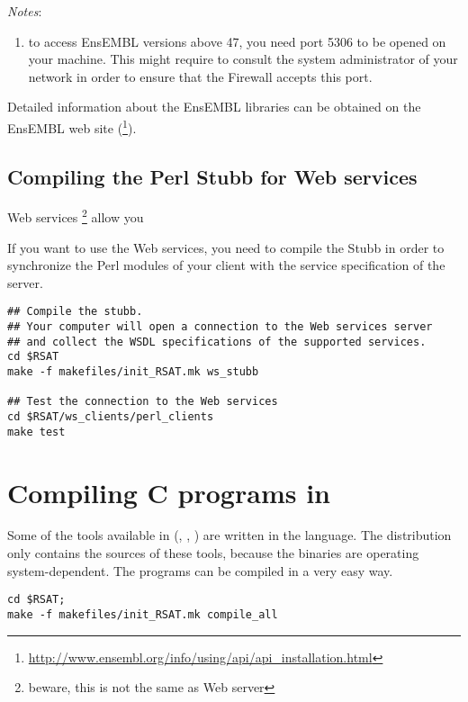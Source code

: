 \documentclass[12pt,a4paper, oneside]{scrreprt} %
\begin{document}
\emph{Notes}: 
\begin{enumerate}
\item to access EnsEMBL versions above 47, you need port 5306 to be
  opened on your machine. This might require to consult the system
  administrator of your network in order to ensure that the Firewall
  accepts this port.
\end{enumerate}

Detailed information about the EnsEMBL libraries can be obtained on
the EnsEMBL web site
(\footnote{\url{http://www.ensembl.org/info/using/api/api\_installation.html}}).

\section{Compiling the Perl Stubb for Web services}

Web services \footnote{beware, this is not the same as Web server} allow you

If you want to use the Web services, you need to compile the Stubb in
order to synchronize the Perl modules of your client with the service
specification of the server.

\begin{lstlisting}
## Compile the stubb.
## Your computer will open a connection to the Web services server 
## and collect the WSDL specifications of the supported services.
cd $RSAT
make -f makefiles/init_RSAT.mk ws_stubb

## Test the connection to the Web services
cd $RSAT/ws_clients/perl_clients
make test
\end{lstlisting}



\chapter{Compiling C programs in \RSAT}

Some of the tools available in \RSAT (,
, ) are written in the
 language. The distribution only contains the sources of
these tools, because the binaries are operating system-dependent. The
programs can be compiled in a very easy way.

\begin{lstlisting}
cd $RSAT;
make -f makefiles/init_RSAT.mk compile_all
\end{lstlisting}
\end{document}
